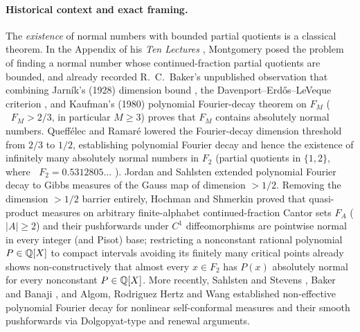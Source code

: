 \documentclass[11pt]{article}
\DeclareMathOperator{\dimH}{\dim_{\mathrm{H}}}
\begin{document}
\paragraph{Historical context and exact framing.}
The \emph{existence} of normal numbers with bounded partial quotients is a classical theorem. In the Appendix of his \emph{Ten Lectures} \cite[Appendix, Problem~45, p.~204]{Montgomery1994}, Montgomery posed the problem of finding a normal number whose continued-fraction partial quotients are bounded, and already recorded R.~C.~Baker's unpublished observation that combining Jarn\'ik's (1928) dimension bound \cite{Jarnik1928}, the Davenport--Erd\H{o}s--LeVeque criterion \cite{DEL1963}, and Kaufman's (1980) polynomial Fourier-decay theorem on $F_M$ ($\dimH F_M>2/3$, in particular $M\ge3$) \cite{Kaufman1980} proves that $F_M$ contains absolutely normal numbers. Queff\'elec and Ramar\'e \cite{QueffelecRamare2003} lowered the Fourier-decay dimension threshold from $2/3$ to $1/2$, establishing polynomial Fourier decay and hence the existence of infinitely many absolutely normal numbers in $F_2$ (partial quotients in $\{1,2\}$, where $\dimH F_2=0.5312805\dots$ \cite{Hensley1992,JenkinsonPollicott2018}). Jordan and Sahlsten \cite{JordanSahlsten2016} extended polynomial Fourier decay to Gibbs measures of the Gauss map of dimension $>1/2$. Removing the dimension $>1/2$ barrier entirely, Hochman and Shmerkin \cite[Theorems~1.4, 1.5, 1.12 and \S1.3.3]{HochmanShmerkin2015} proved that quasi-product measures on arbitrary finite-alphabet continued-fraction Cantor sets $F_A$ ($|A|\ge2$) and their pushforwards under $C^1$ diffeomorphisms are pointwise normal in every integer (and Pisot) base; restricting a nonconstant rational polynomial $P\in\mathbb Q[X]$ to compact intervals avoiding its finitely many critical points already shows non-constructively that almost every $x\in F_2$ has $P(x)$ absolutely normal for every nonconstant $P\in\mathbb Q[X]$. More recently, Sahlsten and Stevens \cite{SahlstenStevens2024}, Baker and Banaji \cite{BakerBanaji2025}, and Algom, Rodriguez Hertz and Wang \cite{ARHW2026} established non-effective polynomial Fourier decay for nonlinear self-conformal measures and their smooth pushforwards via Dolgopyat-type and renewal arguments.
\end{document}
